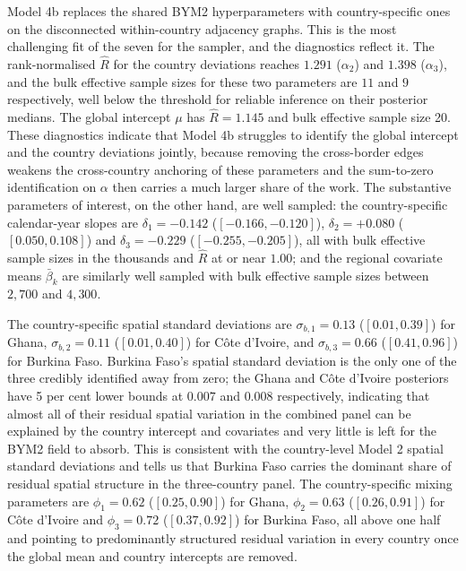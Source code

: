 \documentclass{article}
\begin{document}
Model 4b replaces the shared BYM2 hyperparameters with country-specific
ones on the disconnected within-country adjacency graphs. This is the
most challenging fit of the seven for the sampler, and the diagnostics
reflect it. The rank-normalised \(\hat{R}\) for the country deviations
reaches \(1.291\) (\(\alpha_2\)) and \(1.398\) (\(\alpha_3\)), and the
bulk effective sample sizes for these two parameters are \(11\) and
\(9\) respectively, well below the threshold for reliable inference on
their posterior medians. The global intercept \(\mu\) has
\(\hat{R} = 1.145\) and bulk effective sample size 20. These diagnostics
indicate that Model 4b struggles to identify the global intercept and
the country deviations jointly, because removing the cross-border edges
weakens the cross-country anchoring of these parameters and the
sum-to-zero identification on \(\alpha\) then carries a much larger
share of the work. The substantive parameters of interest, on the other
hand, are well sampled: the country-specific calendar-year slopes are
\(\delta_1 = -0.142\) (\([-0.166, -0.120]\)), \(\delta_2 = +0.080\)
(\([0.050, 0.108]\)) and \(\delta_3 = -0.229\) (\([-0.255, -0.205]\)),
all with bulk effective sample sizes in the thousands and \(\hat{R}\) at
or near \(1.00\); and the regional covariate means \(\bar{\beta}_k\) are
similarly well sampled with bulk effective sample sizes between
\(2{,}700\) and \(4{,}300\).

The country-specific spatial standard deviations are
\(\sigma_{b,1} = 0.13\) (\([0.01, 0.39]\)) for Ghana,
\(\sigma_{b,2} = 0.11\) (\([0.01, 0.40]\)) for Côte d'Ivoire, and
\(\sigma_{b,3} = 0.66\) (\([0.41, 0.96]\)) for Burkina Faso. Burkina
Faso's spatial standard deviation is the only one of the three credibly
identified away from zero; the Ghana and Côte d'Ivoire posteriors have 5
per cent lower bounds at \(0.007\) and \(0.008\) respectively,
indicating that almost all of their residual spatial variation in the
combined panel can be explained by the country intercept and covariates
and very little is left for the BYM2 field to absorb. This is consistent
with the country-level Model 2 spatial standard deviations and tells us
that Burkina Faso carries the dominant share of residual spatial
structure in the three-country panel. The country-specific mixing
parameters are \(\phi_1 = 0.62\) (\([0.25, 0.90]\)) for Ghana,
\(\phi_2 = 0.63\) (\([0.26, 0.91]\)) for Côte d'Ivoire and
\(\phi_3 = 0.72\) (\([0.37, 0.92]\)) for Burkina Faso, all above one
half and pointing to predominantly structured residual variation in
every country once the global mean and country intercepts are removed.
\end{document}
